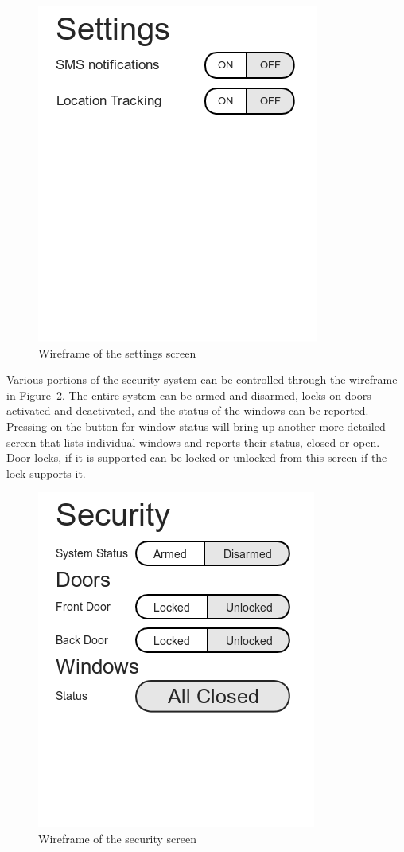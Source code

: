 \documentclass{report}
\begin{document}
\begin{figure}[H]
    \centering
    \includegraphics[scale=0.5]{mock_settings}
    \caption[Wireframe of the settings screen]
            {Wireframe of the settings screen}
    \label{fig:wireframe-settings}
\end{figure}

Various portions of the security system can be controlled through the wireframe
in Figure~\ref{fig:wireframe-security}. The entire system can be armed and
disarmed, locks on doors activated and deactivated, and the status of the
windows can be reported. Pressing on the button for window status will bring up
another more detailed screen that lists individual windows and reports their
status, closed or open. Door locks, if it is supported can be locked or
unlocked from this screen if the lock supports it.


\begin{figure}[H]
    \centering
    \includegraphics[scale=0.5]{mock_security}
    \caption[Wireframe of the security screen]
            {Wireframe of the security screen}
    \label{fig:wireframe-security}
\end{figure}
\end{document}
